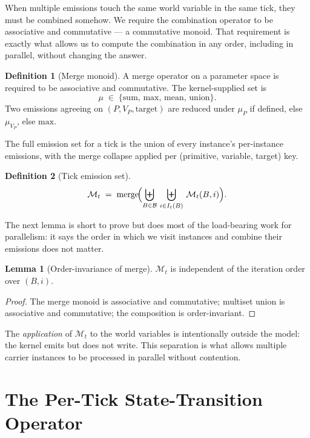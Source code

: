 \documentclass[journal,onecolumn,11pt]{IEEEtran}
\theoremstyle{definition}
\newtheorem{definition}{Definition}
\newtheorem{lemma}{Lemma}
\begin{document}
When multiple emissions touch the same world variable in the same tick, they must be combined somehow. We require the combination operator to be associative and commutative --- a commutative monoid. That requirement is exactly what allows us to compute the combination in any order, including in parallel, without changing the answer.

\begin{definition}[Merge monoid]
A merge operator on a parameter space is required to be associative and commutative. The kernel-supplied set is
\[
\mu \;\in\; \{\mathrm{sum},\, \mathrm{max},\, \mathrm{mean},\, \mathrm{union}\}.
\]
Two emissions agreeing on $(P, V_P, \mathrm{target})$ are reduced under $\mu_P$ if defined, else $\mu_{V_P}$, else $\mathrm{max}$.
\end{definition}

The full emission set for a tick is the union of every instance's per-instance emissions, with the merge collapse applied per (primitive, variable, target) key.

\begin{definition}[Tick emission set]
\[
\mathcal{M}_t \;=\; \mathrm{merge}\!\Bigl(\biguplus_{B \in \mathcal{B}}\,\biguplus_{i \in I_t(B)}\, \mathcal{M}_t(B,i)\Bigr).
\]
\end{definition}

The next lemma is short to prove but does most of the load-bearing work for parallelism: it says the order in which we visit instances and combine their emissions does not matter.

\begin{lemma}[Order-invariance of merge]\label{lem:merge-comm}
$\mathcal{M}_t$ is independent of the iteration order over $(B,i)$.
\end{lemma}

\begin{proof}
The merge monoid is associative and commutative; multiset union is associative and commutative; the composition is order-invariant.
\end{proof}

The \emph{application} of $\mathcal{M}_t$ to the world variables is intentionally outside the model: the kernel emits but does not write. This separation is what allows multiple carrier instances to be processed in parallel without contention.

\section{The Per-Tick State-Transition Operator}
\label{sec:tick}
\end{document}
